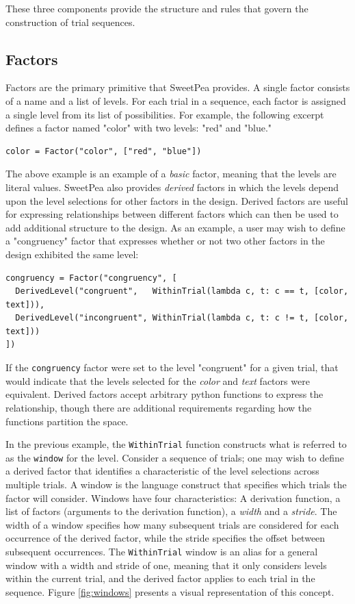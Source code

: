 These three components provide the structure and rules that govern the construction of trial sequences.

\subsection{Factors}

Factors are the primary primitive that SweetPea provides. A single factor consists of a name and a list of levels. For each trial in a sequence, each factor is assigned a single level from its list of possibilities. For example, the following excerpt defines a factor named "color" with two levels: "red" and "blue."

\begin{verbatim}
color = Factor("color", ["red", "blue"])
\end{verbatim}

The above example is an example of a \textit{basic} factor, meaning that the levels are literal values. SweetPea also provides \textit{derived} factors in which the levels depend upon the level selections for other factors in the design. Derived factors are useful for expressing relationships between different factors which can then be used to add additional structure to the design. As an example, a user may wish to define a "congruency" factor that expresses whether or not two other factors in the design exhibited the same level:

\begin{verbatim}
congruency = Factor("congruency", [
  DerivedLevel("congruent",   WithinTrial(lambda c, t: c == t, [color, text])),
  DerivedLevel("incongruent", WithinTrial(lambda c, t: c != t, [color, text]))
])
\end{verbatim}

If the \texttt{congruency} factor were set to the level "congruent" for a given trial, that would indicate that the levels selected for the \textit{color} and \textit{text} factors were equivalent. Derived factors accept arbitrary python functions to express the relationship, though there are additional requirements regarding how the functions partition the space.

In the previous example, the \texttt{WithinTrial} function constructs what is referred to as the \texttt{window} for the level. Consider a sequence of trials; one may wish to define a derived factor that identifies a characteristic of the level selections across multiple trials. A window is the language construct that specifies which trials the factor will consider. Windows have four characteristics: A derivation function, a list of factors (arguments to the derivation function), a \textit{width} and a \textit{stride}. The width of a window specifies how many subsequent trials are considered for each occurrence of the derived factor, while the stride specifies the offset between subsequent occurrences. The \texttt{WithinTrial} window is an alias for a general window with a width and stride of one, meaning that it only considers levels within the current trial, and the derived factor applies to each trial in the sequence. Figure \ref{fig:windows} presents a visual representation of this concept.

